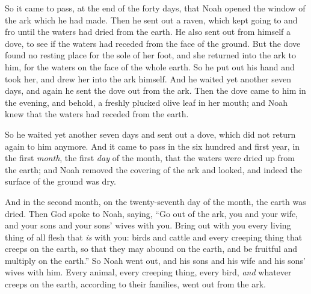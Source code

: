 \bverse So it came to pass, at the end of the forty days, that Noah opened the window of the ark which he had made.
\bverse Then he sent out a raven, which kept going to and fro until the waters had dried from the earth.
\bverse He also sent out from himself a dove, to see if the waters had receded from the face of the ground.
\bverse But the dove found no resting place for the sole of her foot, and she returned into the ark to him, for the waters \were on the face of the whole earth. So he put out his hand and took her, and drew her into the ark himself.
\bverse And he waited yet another seven days, and again he sent the dove out from the ark.
\bverse Then the dove came to him in the evening, and behold, a freshly plucked olive leaf \was in her mouth; and Noah knew that the waters had receded from the earth.

\bverse So he waited yet another seven days and sent out a dove, which did not return again to him anymore. 
\bverse And it came to pass in the six hundred and first year, in the first \textit{month}, the first \textit{day} of the month, that the waters were dried up from the earth; and Noah removed the covering of the ark and looked, and indeed the surface of the ground was dry.
	
\bverse And in the second month, on the twenty-seventh day of the month, the earth was dried.
\bverse Then God spoke to Noah, saying,
\bverse ``Go out of the ark, you and your wife, and your sons and your sons' wives with you.
\bverse Bring out with you every living thing of all flesh that \textit{is} with you: birds and cattle and every creeping thing that creeps on the earth, so that they may abound on the earth, and be fruitful and multiply on the earth.''
\bverse So Noah went out, and his sons and his wife and his sons' wives with him.
\bverse Every animal, every creeping thing, every bird, \textit{and} whatever creeps on the earth, according to their families, went out from the ark.

